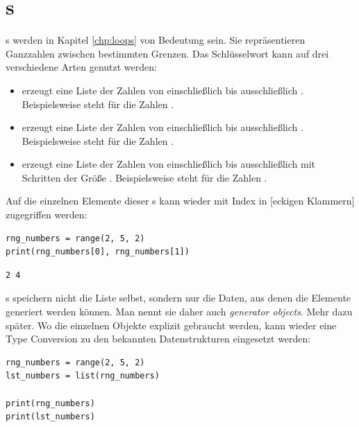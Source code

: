 \section{s}
s werden in Kapitel \ref{chp:loops} von Bedeutung sein. Sie repräsentieren Ganzzahlen zwischen bestimmten Grenzen. Das Schlüsselwort  kann auf drei verschiedene Arten genutzt werden:
\begin{itemize}
\item {} erzeugt eine Liste der Zahlen von einschließlich  bis ausschließlich
	. Beispielsweise steht  für die Zahlen .
\item {} erzeugt eine Liste der Zahlen von einschließlich  bis
	ausschließlich . Beispielsweise steht  für die Zahlen .
\item {} erzeugt eine Liste der Zahlen von einschließlich  bis
	ausschließlich  mit Schritten der Größe . Beispielsweise steht 
	 für die Zahlen .
\end{itemize}

Auf die einzelnen Elemente dieser s kann wieder mit Index in [eckigen Klammern] zugegriffen werden:
\begin{codebox}
\begin{verbatim}
rng_numbers = range(2, 5, 2)
print(rng_numbers[0], rng_numbers[1])
\end{verbatim}
\end{codebox}

\begin{cmdbox}[Ausgabe]
\begin{verbatim}
2 4
\end{verbatim}
\end{cmdbox}

s speichern nicht die Liste selbst, sondern nur die Daten, aus denen die Elemente generiert werden können. Man nennt sie daher auch \emph{generator objects}. Mehr dazu später. Wo die einzelnen Objekte explizit gebraucht werden, kann wieder eine Type Conversion zu den bekannten Datenstrukturen eingesetzt werden:

\begin{codebox}
\begin{verbatim}
rng_numbers = range(2, 5, 2)
lst_numbers = list(rng_numbers)

print(rng_numbers)
print(lst_numbers)
\end{verbatim}
\end{codebox}

